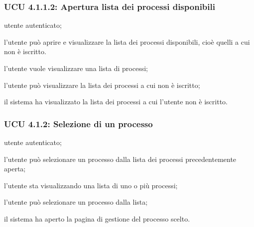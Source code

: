 \subsubsection{UCU 4.1.1.2: Apertura lista dei processi disponibili}
\begin{description}[leftmargin=0cm]
\item[Attori:] utente autenticato;
\item[Descrizione:] l'utente può aprire e visualizzare la lista dei processi disponibili, cioè quelli a cui non è iscritto. 
\item[Precondizione:] l'utente vuole visualizzare una lista di processi;
\item[Scenario principale:] l'utente può visualizzare la lista dei processi a cui non è iscritto;
\item[Postcondizione:] il sistema ha visualizzato la lista dei processi a cui l'utente non è iscritto.
\end{description}

\subsubsection{UCU 4.1.2: Selezione di un processo}
\begin{description}[leftmargin=0cm]
\item[Attori:] utente autenticato;
\item[Descrizione:] l'utente può selezionare un processo dalla lista dei processi precedentemente aperta;
\item[Precondizione:] l'utente sta visualizzando una lista di uno o più processi;
\item[Scenario principale:] l'utente può selezionare un processo dalla lista;
\item[Postcondizione:] il sistema ha aperto la pagina di gestione del processo scelto.
\end{description}

